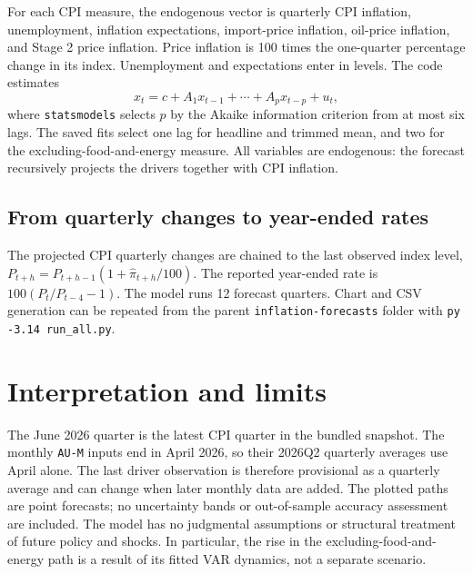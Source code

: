 \documentclass[11pt,a4paper]{article}
\begin{document}
For each CPI measure, the endogenous vector is quarterly CPI inflation, unemployment, inflation expectations, import-price inflation, oil-price inflation, and Stage 2 price inflation. Price inflation is 100 times the one-quarter percentage change in its index. Unemployment and expectations enter in levels. The code estimates
\[
  x_t=c+A_1x_{t-1}+\cdots+A_px_{t-p}+u_t,
\]
where \texttt{statsmodels} selects $p$ by the Akaike information criterion from at most six lags. The saved fits select one lag for headline and trimmed mean, and two for the excluding-food-and-energy measure. All variables are endogenous: the forecast recursively projects the drivers together with CPI inflation.

\subsection{From quarterly changes to year-ended rates}
The projected CPI quarterly changes are chained to the last observed index level, $P_{t+h}=P_{t+h-1}(1+\widehat{\pi}_{t+h}/100)$. The reported year-ended rate is $100(P_t/P_{t-4}-1)$. The model runs 12 forecast quarters. Chart and CSV generation can be repeated from the parent \texttt{inflation-forecasts} folder with \texttt{py -3.14 run\_all.py}.

\section{Interpretation and limits}
The June 2026 quarter is the latest CPI quarter in the bundled snapshot. The monthly \texttt{AU-M} inputs end in April 2026, so their 2026Q2 quarterly averages use April alone. The last driver observation is therefore provisional as a quarterly average and can change when later monthly data are added. The plotted paths are point forecasts; no uncertainty bands or out-of-sample accuracy assessment are included. The model has no judgmental assumptions or structural treatment of future policy and shocks. In particular, the rise in the excluding-food-and-energy path is a result of its fitted VAR dynamics, not a separate scenario.
\end{document}
